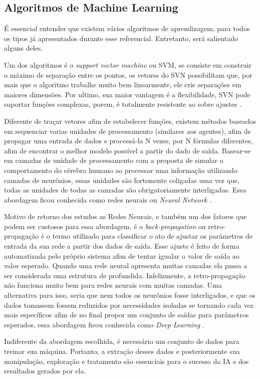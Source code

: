 \subsection{Algoritmos de Machine Learning}
É essencial entender que existem vários algoritmos de aprendizagem, para todos os tipos já apresentados durante esse referencial. Entretanto, será salientado alguns deles.

Um dos algoritmos é o \textit{support vector machine} ou SVM, se consiste em construir o máximo de separação entre os pontos, os vetores do SVN possibilitam que, por mais que o algoritmo trabalhe muito bem linearmente, ele crie separações em maiores dimensões. Por ultimo, sua maior vantagem é a flexibilidade, SVN pode suportar funções complexas, porem, é totalmente resistente ao sobre ajustes \cite[744]{russell2003artificial}.

Diferente de traçar vetores afim de estabelecer funções, existem métodos baseados em sequenciar varias unidades de processamento (similares aos agentes), afim de propagar uma entrada de dados e processá-la N vezes, por N fórmulas diferentes, afim de encontrar o melhor modelo possível a partir do dado de saída. Basear-se em camadas de unidade de processamento com a proposta de simular o comportamento do cérebro humano ao processar uma informação utilizando camadas de neurônios, essas unidades são fortemente coligadas uma vez que, todas as unidades de todas as camadas são obrigatoriamente interligadas. Essa abordagem ficou conhecida como redes neurais ou \textit{Neural Network} \cite{haykin2004comprehensive, russell2003artificial}.

Motivo de retorno dos estudos as Redes Neurais, e também um dos fatores que podem ser custosos para essa abordagem, é o \textit{back-propagation} ou retro-propagação é o termo utilizado para classificar o ato de ajustar os parâmetros de entrada da sua rede a partir dos dados de saída. Esse ajuste é feito de forma automatizada pelo próprio sistema afim de tentar igualar o valor de saída ao valor esperado. Quando uma rede neural apresenta muitas camadas ela passa a ser considerada uma estrutura de profundida. Infelizmente, a retro-propagação não funciona muito bem para redes neurais com muitas camadas. Uma alternativa para isso, seria que nem todos os neurônios fosse interligados, e que os dados tomassem fossem reduzidos por necessidades isoladas se tornando cada vez mais específicos afim de no final propor um conjunto de saídas para parâmetros esperados, essa abordagem ficou conhecida como \textit{Deep Learning} \cite{lecun2015deep}.

Indiferente da abordagem escolhida, é necessário um conjunto de dados para treinar sua máquina. Portanto, a extração desses dados e posteriormente sua manipulação, exploração e tratamento são essenciais para o sucesso da IA e dos resultados gerados por ela.

